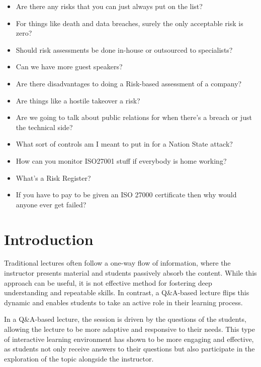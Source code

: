\documentclass[12pt]{article}
\begin{document}
\begin{itemize}
  \item Are there any risks that you can just always put on the list?
  \item For things like death and data breaches, surely the only acceptable risk is zero?
  \item Should risk assessments be done in-house or outsourced to specialists?
  \item Can we have more guest speakers?
  \item Are there disadvantages to doing a Risk-based assessment of a company?
  \item Are things like a hostile takeover a risk?
  \item Are we going to talk about public relations for when there's a breach or just the technical side?
  \item What sort of controls am I meant to put in for a Nation State attack?
  \item How can you monitor ISO27001 stuff if everybody is home working?
  \item What's a Risk Register?
  \item If you have to pay to be given an ISO 27000 certificate then why would anyone ever get failed?
\end{itemize}







\maketitle

\section*{Introduction}

Traditional lectures often follow a one-way flow of information, where the instructor presents material and students passively absorb the content. 
While this approach can be useful, it is not effective method for fostering deep understanding and repeatable skills. In contrast, a Q\&A-based lecture flips this dynamic and enables students to take an active role in their learning process.\cite{reidsema2017flipped} 

In a Q\&A-based lecture, the session is driven by the questions of the students, allowing the lecture to be more adaptive and responsive to their needs. This type of interactive learning environment has shown to be more engaging and effective, as students not only receive answers to their questions but also participate in the exploration of the topic alongside the instructor.\cite{ZhengLanqin2020TEot} 
\end{document}
